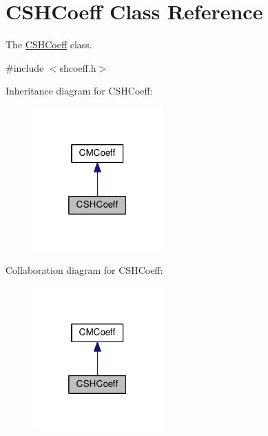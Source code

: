 \hypertarget{classCSHCoeff}{\section{C\-S\-H\-Coeff Class Reference}
\label{classCSHCoeff}
}


The \hyperlink{classCSHCoeff}{C\-S\-H\-Coeff} class.  




{\ttfamily \#include $<$shcoeff.\-h$>$}



Inheritance diagram for C\-S\-H\-Coeff\-:
\nopagebreak
\begin{figure}[H]
\begin{center}
\leavevmode
\includegraphics[width=140pt]{classCSHCoeff__inherit__graph}
\end{center}
\end{figure}


Collaboration diagram for C\-S\-H\-Coeff\-:
\nopagebreak
\begin{figure}[H]
\begin{center}
\leavevmode
\includegraphics[width=140pt]{classCSHCoeff__coll__graph}
\end{center}
\end{figure}
